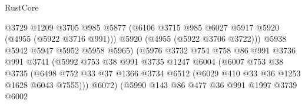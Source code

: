 \begin{lexlean}{RustCore}
\begin{coremodule}
                                      @3729
                                      @1209
                                      @3705
                                      @985
                                      @5877
                                      (@6106
                                        @3715
                                        @985
                                        @6027
                                        @5917
                                        @5920
                                        (@4955 (@5922 @3716 @991)))
                                      @5920
                                      (@4955 (@5922 @3706 @3722)))
                                    @5938
                                    @5942
                                    @5947
                                    @5952
                                    @5958
                                    @5965)
                                  (@5976
                                    @3732
                                    @754
                                    @758
                                    @86
                                    @991
                                    @3736
                                    @991
                                    @3741
                                    (@5992
                                      @753
                                      @38
                                      @991
                                      @3735
                                      @1247
                                      @6004
                                      (@6007
                                        @753
                                        @38
                                        @3735
                                        (@6498
                                          @752
                                          @33
                                          @37
                                          @1366
                                          @3734
                                          @6512
                                          (@6029 @410 @33 @36 @1253 @1628 @6043 @7555)))
                                      @6072)
                                    (@5990
                                      @143
                                      @86
                                      @477
                                      @36
                                      @991
                                      @1997
                                      @3739
                                      @6002

\end{coremodule}
\end{lexlean}
